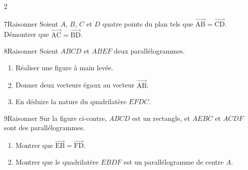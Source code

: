 \documentclass[10pt,a4paper]{article}
\newcommand{\starfull}[1]{{\color{#1}\ding{72}}}
\newcommand{\starempty}{{\color{gray!45}\ding{73}}}
\newcommand{\Vj}[1]{\overrightarrow{\text{#1}}}
\newcommand{\Pt}[1]{\textsf{\footnotesize #1}}
\begin{document}
\begin{multicols}{2}
\begin{Exo}{7}{\starfull{diffblue}\starfull{diffblue}\starempty}{Raisonner}
Soient $A$, $B$, $C$ et $D$ quatre points du plan tels que $\Vj{AB}=\Vj{CD}$.
D\'emontrer que $\Vj{AC}=\Vj{BD}$.
\end{Exo}

\begin{Exo}{8}{\starfull{diffred}\starfull{diffred}\starfull{diffred}}{Raisonner}
Soient $ABCD$ et $ABEF$ deux parall\'elogrammes.
\begin{enumerate}
\item Réaliser une figure à main levée.
\item Donner deux vecteurs \'egaux au vecteur $\Vj{AB}$.
\item En d\'eduire la nature du quadrilat\`ere $EFDC$.
\end{enumerate}
\end{Exo}

\begin{Exo}{9}{\starfull{diffred}\starfull{diffred}\starfull{diffred}}{Raisonner}
Sur la figure ci-contre, $ABCD$ est un rectangle, et $AEBC$ et $ACDF$ sont des parall\'elogrammes.
\begin{center}
\end{center}
\begin{enumerate}
\item Montrer que $\Vj{EB}=\Vj{FD}$.
\item Montrer que le quadrilat\`ere $EBDF$ est un parall\'elogramme de centre $A$.
\end{enumerate}
\end{Exo}


\end{multicols}
\end{document}

